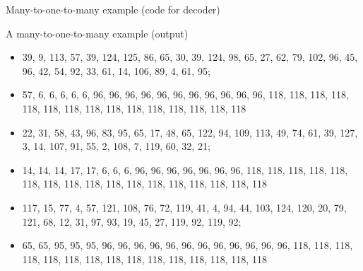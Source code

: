 \documentclass[10pt]{beamer}
\begin{document}
 \begin{frame}{Many-to-one-to-many example (code for decoder)}
   \lstI
 \end{frame}


 \begin{frame}{A many-to-one-to-many example (output)}
   \begin{itemize}
   \item 39, 9, 113, 57, 39, 124, 125, 86, 65, 30, 39, 124, 98, 65, 27, 62, 79, 102, 96, 45, 96, 42, 54, 92, 33, 61, 14, 106, 89, 4, 61, 95;
   \item 57, 6, 6, 6, 6, 6, 96, 96, 96, 96, 96, 96, 96, 96, 96, 96, 96, 118, 118, 118, 118, 118, 118, 118, 118, 118, 118, 118, 118, 118, 118, 118
  \end{itemize}
  \begin{itemize}
   \item 22, 31, 58, 43, 96, 83, 95, 65, 17, 48, 65, 122, 94, 109, 113, 49, 74, 61, 39, 127, 3, 14, 107, 91, 55, 2, 108, 7, 119, 60, 32, 21;
   \item 14, 14, 14, 17, 17, 6, 6, 6, 96, 96, 96, 96, 96, 96, 96, 118, 118, 118, 118, 118, 118, 118, 118, 118, 118, 118, 118, 118, 118, 118, 118, 118
 \end{itemize}
 \begin{itemize}
   \item 117, 15, 77, 4, 57, 121, 108, 76, 72, 119, 41, 4, 94, 44, 103, 124, 120, 20, 79, 121, 68, 12, 31, 97, 93, 19, 45, 27, 119, 92, 119, 92;
   \item 65, 65, 95, 95, 95, 96, 96, 96, 96, 96, 96, 96, 96, 96, 96, 96, 96, 118, 118, 118, 118, 118, 118, 118, 118, 118, 118, 118, 118, 118, 118, 118
 \end{itemize}
 \end{frame}
\end{document}

